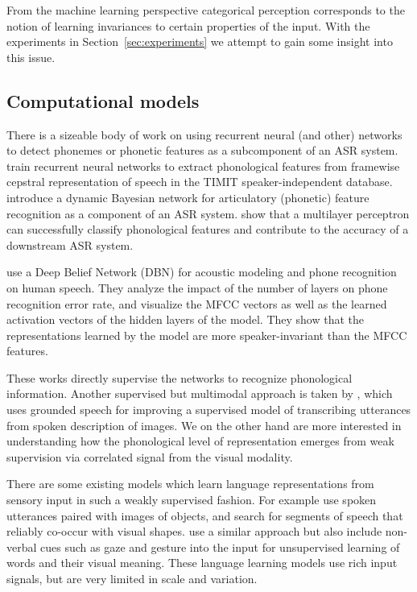 From the machine learning perspective categorical perception
corresponds to the notion of learning invariances to certain
properties of the input. With the experiments in
Section~\ref{sec:experiments} we attempt to gain some insight into this issue.

\subsection{Computational models}
\label{sec:computational}
There is a sizeable body of work on using recurrent neural (and other)
networks to detect phonemes or phonetic features as a subcomponent of
an ASR system. 
\citet{KING2000333} train recurrent neural networks to extract
phonological features from framewise cepstral representation of speech
in the TIMIT speaker-independent
database. 
\citet{frankel2007articulatory} introduce a dynamic Bayesian network
for articulatory (phonetic) feature recognition as a component of an ASR system.
\citet{Siniscalchi2013148} show that a multilayer perceptron can 
successfully classify phonological features and contribute to the
accuracy of a downstream ASR system.

\citet{mohamed2012understanding} use a Deep Belief Network (DBN) for 
acoustic modeling and phone recognition on human speech. They analyze 
the impact of the number of layers on phone recognition error rate, and 
visualize the MFCC vectors as well as the learned activation vectors 
of the hidden layers of the model. They show that the representations learned 
by the model are more speaker-invariant than the MFCC features. 

These works directly supervise  the networks to recognize phonological
information. Another supervised but multimodal approach is taken by 
\citet{sun2016speech}, which uses grounded speech for improving a 
supervised model of transcribing utterances from 
spoken description of images. We on the other hand are more interested 
in understanding how the phonological level of representation emerges 
from weak supervision via correlated signal from the visual modality.

There are some existing models which learn language representations from sensory 
input in such a weakly supervised fashion. For example \citet{Roy2002113} use 
spoken utterances paired with images of objects, and search for segments 
of speech that reliably co-occur with visual shapes. \citet{yu2004multimodal} 
use a similar approach but also include non-verbal cues such as gaze and 
gesture into the input for unsupervised learning of words and their visual 
meaning. These language learning models use rich input signals, but are 
very limited in scale and variation. 

